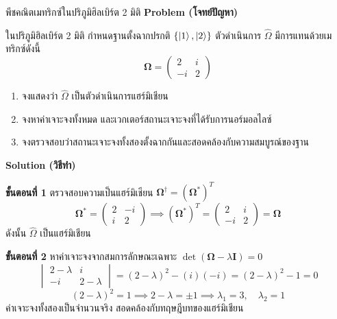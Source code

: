\begin{psctbox}{พีชคณิตเมทริกซ์ในปริภูมิฮิลเบิร์ต 2 มิติ}
\textbf{Problem (โจทย์ปัญหา)}

ในปริภูมิฮิลเบิร์ต 2 มิติ กำหนดฐานตั้งฉากปรกติ $\{\ket{1}, \ket{2}\}$ ตัวดำเนินการ $\hat{\Omega}$ มีการแทนด้วยเมทริกซ์ดังนี้
\begin{equation*}
\boldsymbol{\Omega} = \begin{pmatrix} 2 & i \\ -i & 2 \end{pmatrix}
\end{equation*}
\begin{enumerate}
    \item จงแสดงว่า $\hat{\Omega}$ เป็นตัวดำเนินการแฮร์มิเชียน
    \item จงหาค่าเจาะจงทั้งหมด และเวกเตอร์สถานะเจาะจงที่ได้รับการนอร์มอลไลซ์
    \item จงตรวจสอบว่าสถานะเจาะจงทั้งสองตั้งฉากกันและสอดคล้องกับความสมบูรณ์ของฐาน
\end{enumerate}

\textbf{Solution (วิธีทำ)}

\textbf{ขั้นตอนที่ 1} ตรวจสอบความเป็นแฮร์มิเชียน $\boldsymbol{\Omega}^\dagger = (\boldsymbol{\Omega}^*)^T$
\begin{equation*}
\boldsymbol{\Omega}^* = \begin{pmatrix} 2 & -i \\ i & 2 \end{pmatrix} \implies (\boldsymbol{\Omega}^*)^T = \begin{pmatrix} 2 & i \\ -i & 2 \end{pmatrix} = \boldsymbol{\Omega}
\end{equation*}
ดังนั้น $\hat{\Omega}$ เป็นแฮร์มิเชียน

\textbf{ขั้นตอนที่ 2} หาค่าเจาะจงจากสมการลักษณะเฉพาะ $\det(\boldsymbol{\Omega} - \lambda \mathbf{I}) = 0$
\begin{equation*}
\begin{vmatrix} 2-\lambda & i \\ -i & 2-\lambda \end{vmatrix} = (2-\lambda)^2 - (i)(-i) = (2-\lambda)^2 - 1 = 0
\end{equation*}
\begin{equation*}
(2-\lambda)^2 = 1 \implies 2-\lambda = \pm 1 \implies \lambda_1 = 3, \quad \lambda_2 = 1
\end{equation*}
ค่าเจาะจงทั้งสองเป็นจำนวนจริง สอดคล้องกับทฤษฎีบทของแฮร์มิเชียน


\end{psctbox}
